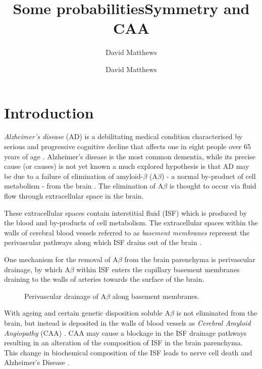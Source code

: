 \documentclass[10pt]{amsart} %
\title{Some probabilities}
\author{David Matthews}
\theoremstyle{definition}
\begin{document}
\title{Symmetry and CAA}
\author{David Matthews}

\section{Introduction}\label{sec:intro}
\emph{Alzheimer's disease} (AD) is a debilitating medical condition characterised by serious and progressive cognitive decline
that affects one in eight people over 65 years of age \cite{Bengt}. Alzheimer's disease is the most common dementia, while its
precise cause (or causes) is not yet known a much explored hypothesis is that AD may be
due to a failure of elimination of amyloid-$\beta$ (A$\beta$) - a normal by-product of cell metabolism 
- from the brain \cite{wellermicro,wellerperi}. The elimination of A$\beta$ is thought to occur via fluid flow through extracellular
space in the brain.

These extracellular spaces contain interstitial fluid (ISF) which is produced by the blood and by-products of cell 
metabolism.  The extracellular spaces within the walls of cerebral blood vessels referred to as \emph{basement membranes} represent the perivascular pathways along which ISF drains out of the brain \cite{wellerperi,wellermicro,Rox}.  

One mechanism for the removal of A$\beta$ from the brain parenchyma is perivascular drainage, by which A$\beta$ within ISF enters the capillary basement membranes draining to the walls of arteries towards the surface of the brain. 

\begin{figure}[h]

              \centering
                \caption{Perivascular drainage of A$\beta$ along basement membranes.}\label{fig:1}
\end{figure}

With ageing and certain genetic disposition soluble A$\beta$ is not eliminated from the brain, but instead is deposited in 
the walls of blood vessels as \emph{Cerebral Amyloid Angiopathy} (CAA) \cite{Rox,wellerperi}. CAA may cause a blockage in 
the ISF drainage pathways resulting in an alteration of the composition of ISF in the brain parenchyma. This change in 
biochemical composition of the ISF leads to nerve cell death and Alzheimer's Disease \cite{Rox}.   
\begin{figure}[h] 
\centering %
\end{figure}
\end{document}
